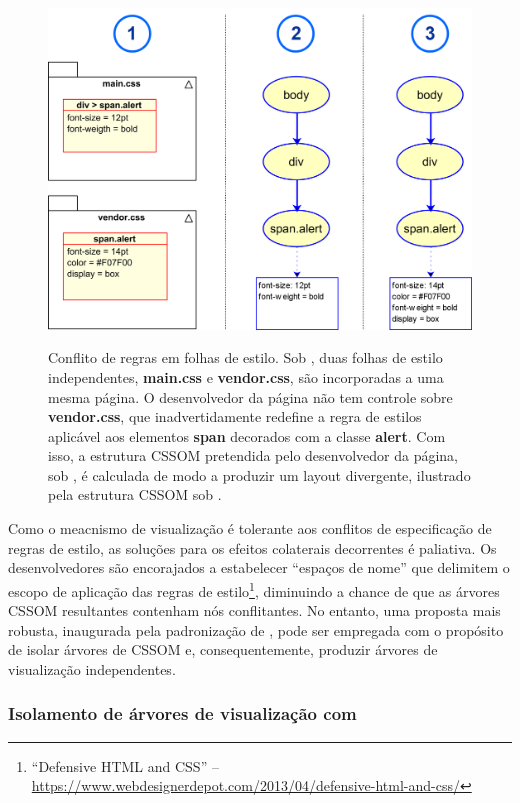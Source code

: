 \begin{figure}[h]
	\centering
	\includegraphics[width=12cm]{diagramas/conflito-CSSOM.png}
	\label{Fig: cssomConflict}
	\caption[Conflito de regras em folhas de estilo]{Conflito de regras em folhas de estilo. Sob , duas folhas de estilo independentes, \textbf{main.css} e \textbf{vendor.css}, são incorporadas a uma mesma página. O desenvolvedor da página não tem controle sobre \textbf{vendor.css}, que inadvertidamente redefine a regra de estilos aplicável aos elementos \textbf{span} decorados com a classe \textbf{alert}. Com isso, a estrutura CSSOM pretendida pelo desenvolvedor da página, sob , é calculada de modo a produzir um layout divergente, ilustrado pela estrutura CSSOM sob .}
\end{figure}

Como o meacnismo de visualização é tolerante aos conflitos de especificação de regras de estilo, as soluções para os efeitos colaterais decorrentes é paliativa. Os desenvolvedores são encorajados a estabelecer ``espaços de nome'' que delimitem o escopo de aplicação das regras de estilo\footnote{``Defensive HTML and CSS'' -- \url{https://www.webdesignerdepot.com/2013/04/defensive-html-and-css/}}, diminuindo a chance de que as árvores CSSOM resultantes contenham nós conflitantes. No entanto, uma proposta mais robusta, inaugurada pela padronização de , pode ser empregada com o propósito de isolar árvores de CSSOM e, consequentemente, produzir árvores de visualização independentes.


\subsubsection{Isolamento de árvores de visualização com }
\label{Section: introShadowDOM}

